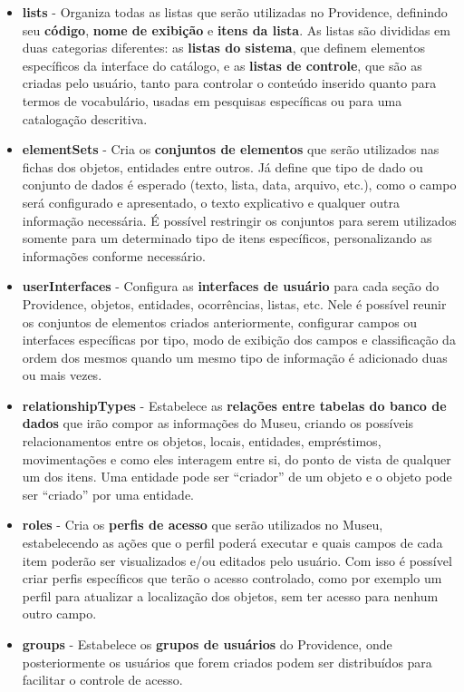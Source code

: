 \documentclass[a4paper,12pt,oneside,onecolumn,final,fleqn]{repUERJ}
\begin{document}
\begin{itemize}
	\item \textbf{lists} - Organiza todas as listas que serão utilizadas no Providence, definindo seu \textbf{código}, \textbf{nome de exibição} e \textbf{itens da lista}. As listas são divididas em duas categorias diferentes: as \textbf{listas do sistema}, que definem elementos específicos da interface do catálogo, e as \textbf{listas de controle}, que são as criadas pelo usuário, tanto para controlar o conteúdo inserido quanto para termos de vocabulário, usadas em pesquisas específicas ou para uma catalogação descritiva.
	\item \textbf{elementSets} - Cria os \textbf{conjuntos de elementos} que serão utilizados nas fichas dos objetos, entidades entre outros. Já define que tipo de dado ou conjunto de dados é esperado (texto, lista, data, arquivo, etc.), como o campo será configurado e apresentado, o texto explicativo e qualquer outra informação necessária. É possível restringir os conjuntos para serem utilizados somente para um determinado tipo de itens específicos, personalizando as informações conforme necessário.
	\item \textbf{userInterfaces} - Configura as \textbf{interfaces de usuário} para cada seção do Providence, objetos, entidades, ocorrências, listas, etc. Nele é possível reunir os conjuntos de elementos criados anteriormente, configurar campos ou interfaces específicas por tipo, modo de exibição dos campos e classificação da ordem dos mesmos quando um mesmo tipo de informação é adicionado duas ou mais vezes. 
	\item \textbf{relationshipTypes} - Estabelece as \textbf{relações entre tabelas do banco de dados} que irão compor as informações do Museu, criando  os possíveis relacionamentos entre os objetos, locais, entidades, empréstimos, movimentações e como eles interagem entre si, do ponto de vista de qualquer um dos itens. Uma entidade pode ser ``criador'' de um objeto e o objeto pode ser ``criado'' por uma entidade.
	\item \textbf{roles} - Cria os \textbf{perfis de acesso} que serão utilizados no Museu, estabelecendo as ações que o perfil poderá executar e quais campos de cada item poderão ser visualizados e/ou editados pelo usuário. Com isso é possível criar perfis específicos que terão o acesso controlado, como por exemplo um perfil para atualizar a localização dos objetos, sem ter acesso para nenhum outro campo.
	\item \textbf{groups} - Estabelece os \textbf{grupos de usuários} do Providence, onde posteriormente os usuários que forem criados podem ser distribuídos para facilitar o controle de acesso.

\end{itemize}
\end{document}
